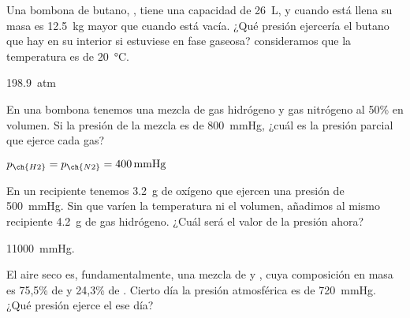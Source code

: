 \documentclass[10pt,a5paper,twoside]{article}
\begin{document}
  \begin{exercise}[
      tags    = {termodinámica, entalpía, entalpia de reacción, calor},
      topics  = {química, termoquímica, termodinámica},
      source  = {FQ 1B SAN 2015, p67, e49},
    ]
    Una bombona de butano, , tiene una capacidad de \SI{26}{\liter}, y cuando está llena su masa es \SI{12.5}{\kilo\gram} mayor que cuando está vacía. ¿Qué presión ejercería el butano que hay en su interior si estuviese en fase gaseosa? consideramos que la temperatura es de \SI{20}{\celsius}.
  \end{exercise}

  \begin{solution}
    \SI{198.9}{atm}
  \end{solution}




  \begin{exercise}[
      tags    = {termodinámica, entalpía, entalpia de reacción, calor},
      topics  = {química, termoquímica, termodinámica},
      source  = {FQ 1B SAN 2015, p68, e56},
    ]
    En una bombona tenemos una mezcla de gas hidrógeno y gas nitrógeno al 50\% en volumen. Si la presión de la mezcla es de \SI{800}{\mmHg}, ¿cuál es la presión parcial que ejerce cada gas?
  \end{exercise}

  \begin{solution}
    \( p_{\ch{H2}} = p_{\ch{N2}} = \SI{400}{\mmHg} \)
  \end{solution}



  \begin{exercise}[
      tags    = {termodinámica, entalpía, entalpia de reacción, calor},
      topics  = {química, termoquímica, termodinámica},
      source  = {FQ 1B SAN 2015, p68, e57},
    ]
    En un recipiente tenemos \SI{3.2}{\gram} de oxígeno que ejercen una presión de \SI{500}{\mmHg}. Sin que varíen la temperatura ni el volumen, añadimos al mismo recipiente \SI{4.2}{\gram} de gas hidrógeno. ¿Cuál será el valor
    de la presión ahora?
  \end{exercise}

  \begin{solution}
    \SI{11000}{\mmHg}.
  \end{solution}




  \begin{exercise}[
      tags    = {termodinámica, entalpía, entalpia de reacción, calor},
      topics  = {química, termoquímica, termodinámica},
      source  = {FQ 1B SAN 2015, p68, ejercicio resuelto 16},
    ]
    El aire seco es, fundamentalmente, una mezcla de  y , cuya composición en masa es 75,5\% de  y 24,3\% de . Cierto día la presión atmosférica es de \SI{720}{\mmHg}. ¿Qué presión ejerce el  ese día?
  \end{exercise}
\end{document}
